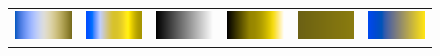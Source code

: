 \documentclass[review,journal]{vgtc}         %
\begin{document}
\begin{figure}
\begin{tabular}{c@{\;}c@{\;}c@{\;}c@{\;}c@{\;}c}
    \includegraphics[width=1.1in]{images/Cool2WarmDeuteranope} &
    \includegraphics[width=1.1in]{images/RainbowDeuteranope} &
    \includegraphics[width=1.1in]{images/GrayscaleDeuteranope} &
    \includegraphics[width=1.1in]{images/BlackBodyDeuteranope} &
    \includegraphics[width=1.1in]{images/Green2RedDeuteranope} &
    \includegraphics[width=1.1in]{images/Blue2YellowDeuteranope} \\


\end{tabular}
\end{figure}
\end{document}
